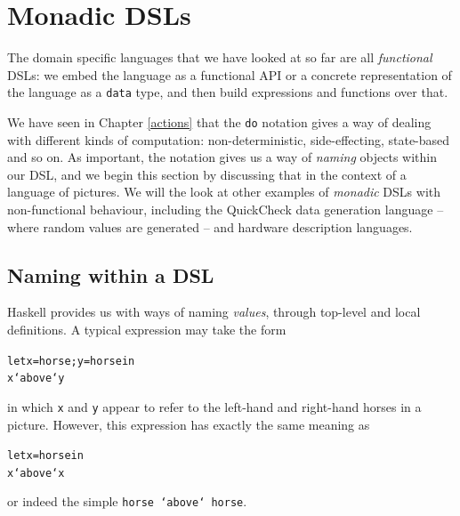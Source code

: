 
\section{Monadic DSLs}


The domain specific languages that we have looked at so far are all \emph{functional} DSLs: we embed the language as a functional API or a concrete representation of the language as a \texttt{data} type, and then build expressions and functions over that.

We have seen in Chapter \ref{actions} that the \texttt{do} notation gives a way of dealing with different kinds of computation: non-deterministic, side-effecting, state-based and so on. As important, the notation gives us a way of \emph{naming} objects within our DSL, and we begin this section by discussing that in the context of a language of pictures. We will the look at other examples of \emph{monadic} DSLs with non-functional behaviour, including the QuickCheck data generation language -- where random values are generated -- and hardware description languages.

\subsection*{Naming within a DSL}

Haskell provides us with ways of naming \emph{values}, through top-level and local definitions. A typical expression may take the form
\begin{alltt}
let x=horse; y=horse in
  x `above` y
\end{alltt}
in which \texttt{x} and \texttt{y} appear to refer to the left-hand and right-hand horses in a picture. However, this expression has exactly the same meaning as
\begin{alltt}
let x=horse in
  x `above` x
\end{alltt}
or indeed the simple \texttt{horse `above` horse}.


